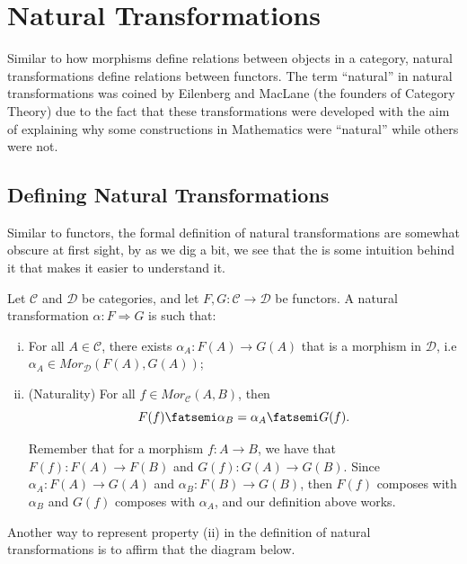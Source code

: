 \chapter{Natural Transformations}

Similar to how morphisms define relations between objects in a category, natural transformations
define relations between functors.
The term ``natural'' in natural transformations was coined by Eilenberg and MacLane (the founders
of Category Theory) due to the fact that these transformations were developed with the
aim of explaining why some constructions in Mathematics were ``natural'' while others
were not.


\section{Defining Natural Transformations}

Similar to functors, the formal definition of natural transformations
are somewhat obscure at first sight, by as we dig a bit, we see that the is
some intuition behind it that makes it easier to understand it.

\begin{definition}
	Let $\mathcal C$ and $\mathcal D$ be categories, and let $F,G:\mathcal C \to \mathcal D$ be functors.
	A natural transformation $\alpha: F \Rightarrow G$ is such that:
	\begin{enumerate}[(i)]
		\item For all $A \in \mathcal C$, there exists $\alpha_A :F(A) \to G(A)$ that is
		      a morphism in $\mathcal D$, i.e $\alpha_A \in Mor_\mathcal D (F(A), G(A))$;
		\item (Naturality) For all $f \in Mor_\mathcal C (A,B)$, then
		      \begin{displaymath}
			      F(f)\fatsemi \alpha_B = \alpha_A \fatsemi G(f).
		      \end{displaymath}

		      Remember that for a morphism $f:A \to B$, we have that $F(f):F(A)\to F(B)$ and $G(f):G(A) \to G(B)$.
		      Since $\alpha_A: F(A) \to G(A)$ and $\alpha_B : F(B) \to G(B)$, then $F(f)$ composes
		      with $\alpha_B$ and $G(f)$ composes with $\alpha_A$, and our definition above works.
	\end{enumerate}
	\label{def:NaturalTransformation}
\end{definition}

Another way to represent property (ii) in the definition of natural transformations
is to affirm that the diagram below.

